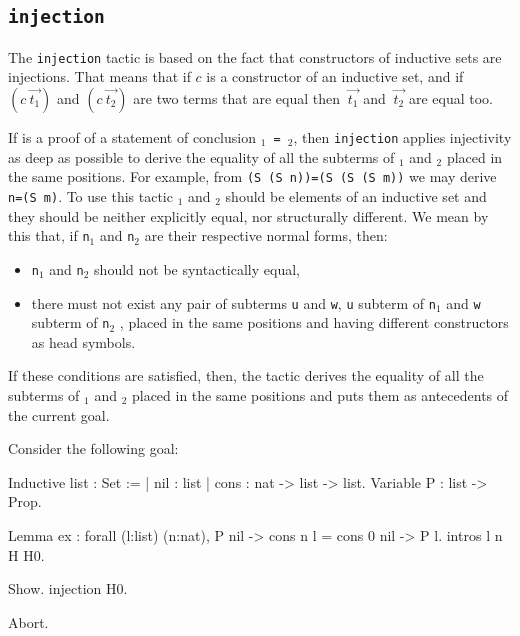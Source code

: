 \subsection{\tt injection {\term}
\label{injection}
}

The {\tt injection} tactic is based on the fact that constructors of
inductive sets are injections. That means that if $c$ is a constructor
of an inductive set, and if $(c~\vec{t_1})$ and $(c~\vec{t_2})$ are two
terms that are equal then $~\vec{t_1}$ and $~\vec{t_2}$ are equal
too.

If {\term} is a proof of a statement of conclusion
 {\tt {\term$_1$} = {\term$_2$}},
then {\tt injection} applies injectivity as deep as possible to
derive the equality of all the subterms of {\term$_1$} and {\term$_2$}
placed in the same positions. For example, from {\tt (S
  (S n))=(S (S (S m))} we may derive {\tt n=(S m)}.  To use this
tactic {\term$_1$} and {\term$_2$} should be elements of an inductive
set and they should be neither explicitly equal, nor structurally
different. We mean by this that, if {\tt n$_1$} and {\tt n$_2$} are
their respective normal forms, then:
\begin{itemize}
\item {\tt n$_1$} and {\tt n$_2$} should not be syntactically equal,
\item there must not exist any pair of subterms {\tt u} and {\tt w},
  {\tt u} subterm of {\tt n$_1$} and {\tt w} subterm of {\tt n$_2$} ,
  placed in the same positions and having different constructors as
  head symbols.
\end{itemize}
If these conditions are satisfied, then, the tactic derives the
equality of all the subterms of {\term$_1$} and {\term$_2$} placed in
the same positions and puts them as antecedents of the current goal.

\Example Consider the following goal:

\begin{coq_example*}
Inductive list : Set :=
  | nil : list
  | cons : nat -> list -> list.
Variable P : list -> Prop.
\end{coq_example*}
\begin{coq_eval}
Lemma ex :
 forall (l:list) (n:nat), P nil -> cons n l = cons 0 nil -> P l.
intros l n H H0.
\end{coq_eval}
\begin{coq_example}
Show.
injection H0.
\end{coq_example}
\begin{coq_eval}
Abort.
\end{coq_eval}

